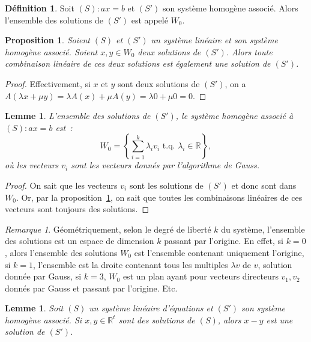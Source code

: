 \documentclass{article}
\newcommand{\R}{\mathbb R}
\newcommand{\tq}{\textrm{ t.q. }}
\newtheorem{prp}[thm]{Proposition}
\newtheorem{lem}[thm]{Lemme}
\theoremstyle{definition}
\newtheorem{déf}[thm]{Définition}
\theoremstyle{remark}
\newtheorem*{rmq}{Remarque}
\begin{document}
		\begin{déf} Soit $(S) : ax = b$ et $(S')$ son système homogène associé. Alors l'ensemble des solutions de $(S')$ est appelé $W_0$. \end{déf}

		\begin{prp}\label{combiliW0} Soient $(S)$ et $(S')$ un système linéaire et son système homogène associé. Soient $x, y \in W_0$ deux solutions de $(S')$. Alors
		toute combinaison linéaire de ces deux solutions est également une solution de $(S')$. \end{prp}

		\begin{proof} Effectivement, si $x$ et $y$ sont deux solutions de $(S')$, on a $A(\lambda x + \mu y) = \lambda A(x) + \mu A(y) = \lambda 0 + \mu 0 = 0$. \end{proof}

		\begin{lem} L'ensemble des solutions de $(S')$, le système homogène associé à $(S) : ax = b$ est~:
		\[W_0 = \left\{\sum_{i=1}^k\lambda_i v_i \tq \lambda_i \in \R\right\},\]
		où les vecteurs $v_i$ sont les vecteurs donnés par l'algorithme de Gauss. \end{lem}

		\begin{proof} On sait que les vecteurs $v_i$ sont les solutions de $(S')$ et donc sont dans $W_0$. Or, par la proposition~\ref{combiliW0}, on sait que toutes les
		combinaisons linéaires de ces vecteurs sont toujours des solutions. \end{proof}

		\begin{rmq} Géométriquement, selon le degré de liberté $k$ du système, l'ensemble des solutions est un espace de dimension $k$ passant par l'origine. En effet, si
		$k=0$, alors l'ensemble des solutions $W_0$ est l'ensemble contenant uniquement l'origine, si $k=1$, l'ensemble est la droite contenant tous les multiples
		$\lambda v$ de $v$, solution donnée par Gauss, si $k=3$, $W_0$ est un plan ayant pour vecteurs directeurs $v_1, v_2$ donnés par Gauss et passant par l'origine.
		Etc. \end{rmq}

		\begin{lem}\label{W-W=W_0} Soit $(S)$ un système linéaire d'équations et $(S')$ son système homogène associé. Si $x, y \in \R^t$ sont des solutions de $(S)$,
		alors $x-y$ est une solution de $(S')$. \end{lem}
\end{document}
